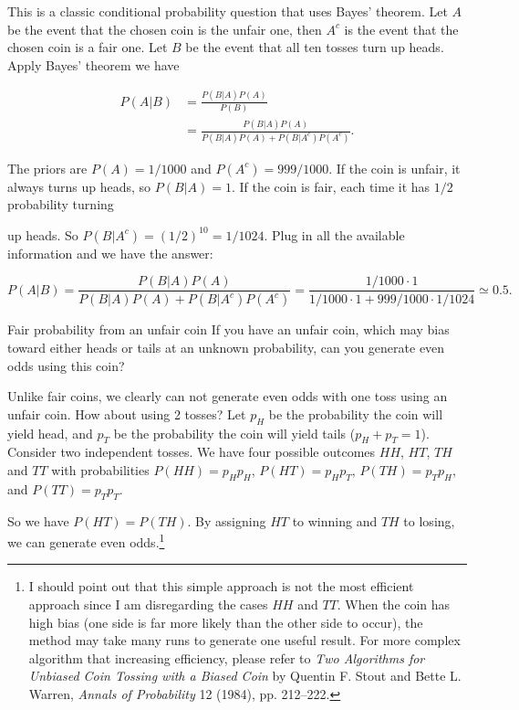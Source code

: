 \begin{solution}
This is a classic conditional probability question that uses Bayes' theorem. Let $A$ be the event that the chosen coin is the unfair one, then $A^c$ is the event that the chosen coin is a fair one. Let $B$ be the event that all ten tosses turn up heads. Apply Bayes' theorem we have

\[
\begin{aligned}
P(A\vert B)&=\frac{P(B\vert A)P(A)}{P(B)}\\
&=\frac{P(B\vert A)P(A)}{P(B\vert A)P(A)+P(B\vert A^c)P(A^c)}.
\end{aligned}
\]

The priors are $P(A)=1/1000$ and $P(A^c)=999/1000$. If the coin is unfair, it always turns up heads, so $P(B\vert A)=1$. If the coin is fair, each time it has $1/2$ probability turning

up heads. So $P(B\vert A^c)=(1/2)^{10}=1/1024$. Plug in all the available information and we have the answer:

\[
P(A\vert B)=\frac{P(B\vert A)P(A)}{P(B\vert A)P(A)+P(B\vert A^c)P(A^c)}
=\frac{1/1000\cdot1}{1/1000\cdot1+999/1000\cdot1/1024}\simeq 0.5.
\]

\end{solution}

\begin{problem}{Fair probability from an unfair coin}
If you have an unfair coin, which may bias toward either heads or tails at an unknown probability, can you generate even odds using this coin?
\end{problem}

\begin{solution}
Unlike fair coins, we clearly can not generate even odds with one toss using an unfair coin. How about using 2 tosses? Let $p_H$ be the probability the coin will yield head, and $p_T$ be the probability the coin will yield tails ($p_H+p_T=1$). Consider two independent tosses. We have four possible outcomes $HH$, $HT$, $TH$ and $TT$ with probabilities $P(HH)=p_Hp_H$, $P(HT)=p_Hp_T$, $P(TH)=p_Tp_H$, and $P(TT)=p_Tp_T$.

So we have $P(HT)=P(TH)$. By assigning $HT$ to winning and $TH$ to losing, we can generate even odds.\footnote[12]{I should point out that this simple approach is not the most efficient approach since I am disregarding the cases $HH$ and $TT$. When the coin has high bias (one side is far more likely than the other side to occur), the method may take many runs to generate one useful result. For more complex algorithm that increasing efficiency, please refer to \emph{Two Algorithms for Unbiased Coin Tossing with a Biased Coin} by Quentin F. Stout and Bette L. Warren, \emph{Annals of Probability} 12 (1984), pp. 212--222.}\qedhere

\end{solution}


